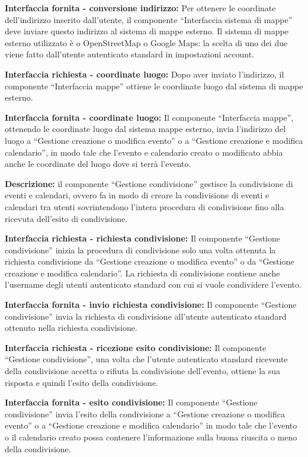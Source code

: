 \begin{listaPersonale}[DCI]{}
    \textbf{Interfaccia fornita - conversione indirizzo:} Per ottenere le coordinate dell'indirizzo inserito dall'utente, il componente “Interfaccia sistema di mappe” deve inviare questo indirizzo al sistema di mappe esterno. Il sistema di mappe esterno utilizzato è o OpenStreetMap o Google Maps: la scelta di uno dei due viene fatto dall'utente autenticato standard in impostazioni account.

    \textbf{Interfaccia richiesta - coordinate luogo:} Dopo aver inviato l'indirizzo, il componente “Interfaccia mappe” ottiene le coordinate luogo dal sistema di mappe esterno.

    \textbf{Interfaccia fornita - coordinate luogo:} Il componente “Interfaccia mappe”, ottenendo le coordinate luogo dal sistema mappe esterno, invia l'indirizzo del luogo a “Gestione creazione o modifica evento” o a “Gestione creazione e modifica calendario”, in modo tale che l'evento e calendario creato o modificato abbia anche le coordinate del luogo dove si terrà l'evento.




    \textbf{Descrizione:} il componente “Gestione condivisione” gestisce la condivisione di eventi e calendari, ovvero fa in modo di creare la condivisione di eventi e calendari tra utenti sovrintendono l'intera procedura di condivisione fino alla ricevuta dell'esito di condivisione.

    \textbf{Interfaccia richiesta - richiesta condivisione:} Il componente “Gestione condivisione” inizia la procedura di condivisione solo una volta ottenuta la richiesta condivisione da “Gestione creazione o modifica evento” o da “Gestione creazione e modifica calendario”. La richiesta di condivisione contiene anche l'username degli utenti autenticato standard con cui si vuole condividere l'evento.

    \textbf{Interfaccia fornita - invio richiesta condivisione:} Il componente “Gestione condivisione” invia la richiesta di condivisione all'utente autenticato standard ottenuto nella richiesta condivisione.

    \textbf{Interfaccia richiesta - ricezione esito condivisione:} Il componente “Gestione condivisione”, una volta che l'utente autenticato standard ricevente della condivisione accetta o rifiuta la condivisione dell'evento, ottiene la sua risposta e quindi l'esito della condivisione.

    \textbf{Interfaccia fornita - esito condivisione:} Il componente “Gestione condivisione” invia l'esito della condivisione a “Gestione creazione o modifica evento” o a “Gestione creazione e modifica calendario” in modo tale che l'evento o il calendario creato possa contenere l'informazione sulla buona riuscita o meno della condivisione.



\end{listaPersonale}
